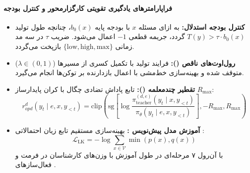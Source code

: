\paragraph*{فراپارامترهای یادگیری تقویتی کارگزارمحور و کنترل بودجه}
\begin{itemize}
    \item \textbf{کنترل بودجه استدلال:} به ازای مسئله $x$ با بودجه پایه $b_0(x)$، چنانچه طول تولید $T(y) > \tau \cdot b_0(x)$ گردد، جریمه قطعی $-1$ اعمال می‌شود. ضریب $\tau$ در سه مد زمانی $\{\text{low}, \text{high}, \text{max}\}$ بازپخت می‌گردد.
    \item \textbf{رول‌اوت‌های ناقص ():} فرایند تولید با تکمیل کسری از مسیرها ($\lambda \in (0, 1)$) متوقف شده و بهینه‌سازی خط‌مشی با اعمال بازدارنده بر توکن‌ها انجام می‌گیرد.
    \item \textbf{تقطیر چندمعلمه ():} تابع پاداش تضادی چگال با کران پایدارساز $R_{\max}$:
    \begin{equation}
        r_{opd}^d(y_t \mid e, x, y_{<t}) = \text{clip}\left( \text{sg}\left[ \log \frac{\pi_{\text{teacher}}^{(d,e)}(y_t \mid x, y_{<t})}{\pi_\theta(y_t \mid e, x, y_{<t})} \right], -R_{\max}, R_{\max} \right)
    \end{equation}
    \item \textbf{آموزش مدل پیش‌نویس :} بهینه‌سازی مستقیم تابع زیان احتمالاتی :
    \begin{equation}
        \mathcal{L}_{\text{LK}} = -\log \sum_{x \in \mathcal{V}} \min(p(x), q(x))
    \end{equation}
    با آن‌رول ۷ مرحله‌ای در طول آموزش با وزن‌های کارشناسان در فرمت  و فعال‌سازهای .
\end{itemize}


